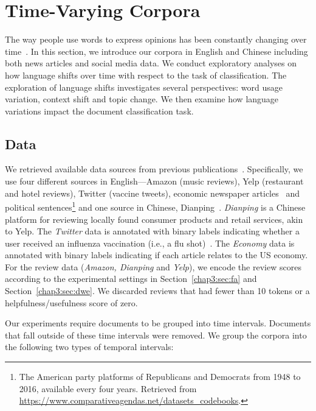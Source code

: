 \section{Time-Varying Corpora}
\label{chap3:sec:data}

The way people use words to express opinions has been constantly changing over time~\cite{mihalcea2012word, kulkarni2015statistically, hamilton2016diachronic}. In this section, we introduce our corpora in English and Chinese including both news articles and social media data. We conduct exploratory analyses on how language shifts over time with respect to the task of classification. The exploration of language shifts investigates several perspectives: word usage variation, context shift and topic change. We then examine how language variations impact the document classification task.

\subsection{Data}
We retrieved available data sources from previous publications~\cite{zhang2014explicit, he2016ups, huang2018examining}. Specifically, we use four different sources in English---Amazon (music reviews), Yelp (restaurant and hotel reviews), Twitter (vaccine tweets), economic newspaper articles~\cite{figure_eight_2015} and political sentences\footnote{The American party platforms of Republicans and Democrats from 1948 to 2016, available every four years. Retrieved from \url{https://www.comparativeagendas.net/datasets_codebooks}.} and one source in Chinese, Dianping~\cite{meituan-dianping_2019}.
\textit{Dianping} is a Chinese platform for reviewing locally found consumer products and retail services, akin to Yelp.
The \textit{Twitter} data is annotated with binary labels indicating whether a user received an influenza vaccination (i.e., a flu shot)~\cite{huang2017examining}.
The \textit{Economy} data is annotated with binary labels indicating if each article relates to the US economy. 
For the review data (\textit{Amazon, Dianping} and \textit{Yelp}), we encode the review scores according to the experimental settings in Section~\ref{chap3:sec:fa} and Section~\ref{chap3:sec:dwe}. 
We discarded reviews that had fewer than 10 tokens or a helpfulness/usefulness score of zero. 

Our experiments require documents to be grouped into time intervals.
Documents that fall outside of these time intervals were removed. 
We group the corpora into the following two types of temporal intervals:

